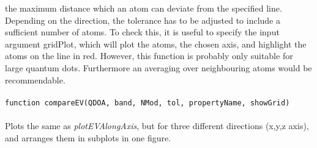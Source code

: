 		 the maximum distance which an atom can deviate from the specified line. Depending on the direction, the tolerance has to be adjusted to include 
		 a sufficient number of atoms. To check this, it is useful to specify the input argument gridPlot, which will plot the atoms, the chosen axis, and highlight 
		 the atoms on the line in red. However, this function is probably only suitable for large quantum dots. Furthermore an averaging over neighbouring atoms 
		 would be recommendable.\\\\
		\lstinline{function compareEV(QDOA, band, NMod, tol, propertyName, showGrid)}\\\\
		Plots the same as \textit{plotEVAlongAxis}, but for three different directions (x,y,z axis), and arranges them in subplots in one figure.
